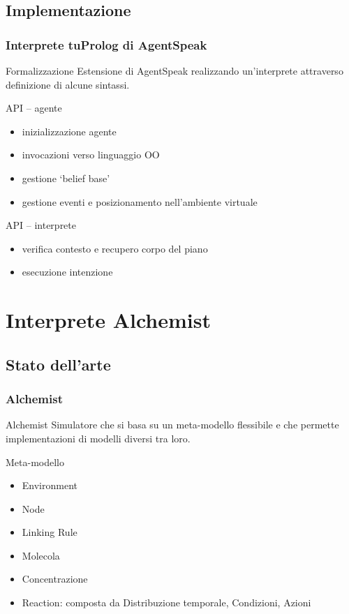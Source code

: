 \documentclass[handout]{beamer}\mode<presentation>{\usetheme{AMSCesenaBleu}}
\begin{document}
\subsection{Implementazione}
\begin{frame}
\frametitle{Interprete tuProlog di AgentSpeak}
\begin{block}{Formalizzazione}
Estensione di AgentSpeak realizzando un'interprete attraverso definizione di alcune sintassi.
\end{block}

\begin{block}{API -- agente}
\begin{itemize}
\item inizializzazione agente
\item invocazioni verso linguaggio OO
\item gestione `belief base'
\item gestione eventi e posizionamento nell'ambiente virtuale
\end{itemize}
\end{block}

\begin{block}{API -- interprete}
\begin{itemize}
\item verifica contesto e recupero corpo del piano
\item esecuzione intenzione
\end{itemize}
\end{block}
\end{frame}



\section{Interprete Alchemist}

\subsection{Stato dell'arte}
\begin{frame}
\frametitle{Alchemist}
\begin{block}{Alchemist}
Simulatore che si basa su un meta-modello flessibile e che permette implementazioni di modelli diversi tra loro.
\end{block}
\begin{block}{Meta-modello}
\begin{itemize}
\item Environment
\item Node
\item Linking Rule
\item Molecola
\item Concentrazione
\item Reaction: composta da Distribuzione temporale, Condizioni, Azioni
\end{itemize}
\end{block}
\end{frame}
\end{document}
